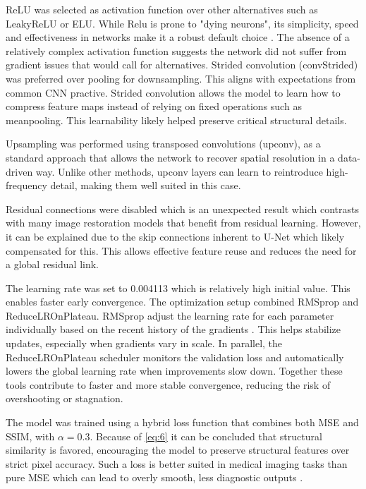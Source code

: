 \documentclass[twocolumn]{article}
\begin{document}
ReLU was selected as activation function over other alternatives such as LeakyReLU or ELU. 
While Relu is prone to "dying neurons", its simplicity, speed and effectiveness in networks make it a robust default choice \cite{relu}. 
The absence of a relatively complex activation function suggests the network did not suffer from gradient issues that would call for alternatives. 
Strided convolution (convStrided) was preferred over pooling for downsampling. 
This aligns with expectations from common CNN practive. 
Strided convolution allows the model to learn how to compress feature maps instead of relying on fixed operations such as meanpooling. 
This learnability likely helped preserve critical structural details. 

Upsampling was performed using transposed convolutions (upconv), as a standard approach that allows the network to recover spatial resolution in a data-driven way. 
Unlike other methods, upconv layers can learn to reintroduce high-frequency detail, making them well suited in this case.

Residual connections were disabled which is an unexpected result which contrasts with many image restoration models that benefit from residual learning. 
However, it can be explained due to the skip connections inherent to U-Net which likely compensated for this. 
This allows effective feature reuse and reduces the need for a global residual link.

The learning rate was set to 0.004113 which is relatively high initial value. This enables faster early convergence. 
The optimization setup combined RMSprop and ReduceLROnPlateau. 
RMSprop adjust the learning rate for each parameter individually based on the recent history of the gradients \cite{9036442}. 
This helps stabilize updates, especially when gradients vary in scale. 
In parallel, the ReduceLROnPlateau scheduler monitors the validation loss and automatically lowers the global learning rate when improvements slow down. 
Together these tools contribute to faster and more stable convergence, reducing the risk of overshooting or stagnation.

The model was trained using a hybrid loss function that combines both MSE and SSIM, with  $\alpha=0.3$. 
Because of \ref{eq:6} it can be concluded that structural similarity is favored, encouraging the model to preserve structural features over strict pixel accuracy. 
Such a loss is better suited in medical imaging tasks than pure MSE which can lead to overly smooth, less diagnostic outputs \cite{Dastmalchi}. 
\end{document}
